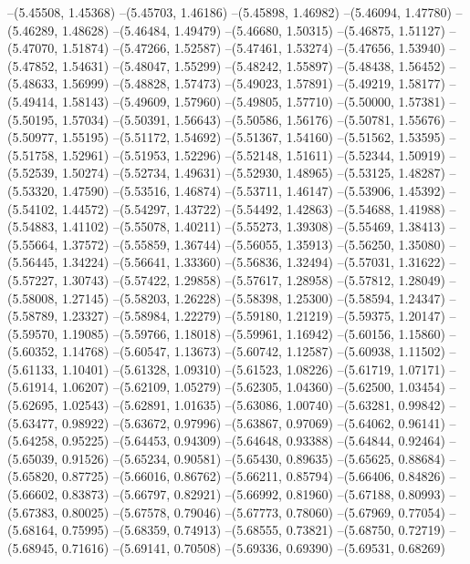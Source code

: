 --(5.45508, 1.45368)
--(5.45703, 1.46186)
--(5.45898, 1.46982)
--(5.46094, 1.47780)
--(5.46289, 1.48628)
--(5.46484, 1.49479)
--(5.46680, 1.50315)
--(5.46875, 1.51127)
--(5.47070, 1.51874)
--(5.47266, 1.52587)
--(5.47461, 1.53274)
--(5.47656, 1.53940)
--(5.47852, 1.54631)
--(5.48047, 1.55299)
--(5.48242, 1.55897)
--(5.48438, 1.56452)
--(5.48633, 1.56999)
--(5.48828, 1.57473)
--(5.49023, 1.57891)
--(5.49219, 1.58177)
--(5.49414, 1.58143)
--(5.49609, 1.57960)
--(5.49805, 1.57710)
--(5.50000, 1.57381)
--(5.50195, 1.57034)
--(5.50391, 1.56643)
--(5.50586, 1.56176)
--(5.50781, 1.55676)
--(5.50977, 1.55195)
--(5.51172, 1.54692)
--(5.51367, 1.54160)
--(5.51562, 1.53595)
--(5.51758, 1.52961)
--(5.51953, 1.52296)
--(5.52148, 1.51611)
--(5.52344, 1.50919)
--(5.52539, 1.50274)
--(5.52734, 1.49631)
--(5.52930, 1.48965)
--(5.53125, 1.48287)
--(5.53320, 1.47590)
--(5.53516, 1.46874)
--(5.53711, 1.46147)
--(5.53906, 1.45392)
--(5.54102, 1.44572)
--(5.54297, 1.43722)
--(5.54492, 1.42863)
--(5.54688, 1.41988)
--(5.54883, 1.41102)
--(5.55078, 1.40211)
--(5.55273, 1.39308)
--(5.55469, 1.38413)
--(5.55664, 1.37572)
--(5.55859, 1.36744)
--(5.56055, 1.35913)
--(5.56250, 1.35080)
--(5.56445, 1.34224)
--(5.56641, 1.33360)
--(5.56836, 1.32494)
--(5.57031, 1.31622)
--(5.57227, 1.30743)
--(5.57422, 1.29858)
--(5.57617, 1.28958)
--(5.57812, 1.28049)
--(5.58008, 1.27145)
--(5.58203, 1.26228)
--(5.58398, 1.25300)
--(5.58594, 1.24347)
--(5.58789, 1.23327)
--(5.58984, 1.22279)
--(5.59180, 1.21219)
--(5.59375, 1.20147)
--(5.59570, 1.19085)
--(5.59766, 1.18018)
--(5.59961, 1.16942)
--(5.60156, 1.15860)
--(5.60352, 1.14768)
--(5.60547, 1.13673)
--(5.60742, 1.12587)
--(5.60938, 1.11502)
--(5.61133, 1.10401)
--(5.61328, 1.09310)
--(5.61523, 1.08226)
--(5.61719, 1.07171)
--(5.61914, 1.06207)
--(5.62109, 1.05279)
--(5.62305, 1.04360)
--(5.62500, 1.03454)
--(5.62695, 1.02543)
--(5.62891, 1.01635)
--(5.63086, 1.00740)
--(5.63281, 0.99842)
--(5.63477, 0.98922)
--(5.63672, 0.97996)
--(5.63867, 0.97069)
--(5.64062, 0.96141)
--(5.64258, 0.95225)
--(5.64453, 0.94309)
--(5.64648, 0.93388)
--(5.64844, 0.92464)
--(5.65039, 0.91526)
--(5.65234, 0.90581)
--(5.65430, 0.89635)
--(5.65625, 0.88684)
--(5.65820, 0.87725)
--(5.66016, 0.86762)
--(5.66211, 0.85794)
--(5.66406, 0.84826)
--(5.66602, 0.83873)
--(5.66797, 0.82921)
--(5.66992, 0.81960)
--(5.67188, 0.80993)
--(5.67383, 0.80025)
--(5.67578, 0.79046)
--(5.67773, 0.78060)
--(5.67969, 0.77054)
--(5.68164, 0.75995)
--(5.68359, 0.74913)
--(5.68555, 0.73821)
--(5.68750, 0.72719)
--(5.68945, 0.71616)
--(5.69141, 0.70508)
--(5.69336, 0.69390)
--(5.69531, 0.68269)
